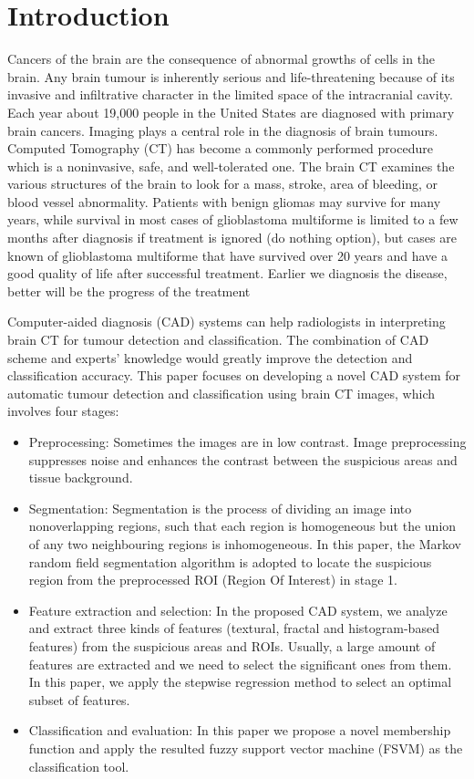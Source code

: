\chapter{Introduction}

      Cancers of the brain are the consequence of abnormal growths of cells in the brain. Any brain tumour is inherently serious and life-threatening because of its invasive and infiltrative character in the limited space of the intracranial cavity. Each year about 19,000 people in the United States are diagnosed with primary brain cancers. Imaging plays a central role in the diagnosis of brain tumours. Computed Tomography (CT) has become a commonly performed procedure which is a noninvasive, safe, and well-tolerated one. The brain CT examines the various structures of the brain to look for a mass, stroke, area of bleeding, or blood vessel abnormality. Patients with benign gliomas may survive for many years, while survival in most cases of glioblastoma multiforme is limited to a few months after diagnosis if treatment is ignored (do nothing option), but cases are known of glioblastoma multiforme that have survived over 20 years and have a good quality of life after successful treatment. Earlier we diagnosis the disease, better will be the progress of the treatment    
      
       Computer-aided diagnosis (CAD) systems can help radiologists in interpreting brain CT for tumour detection and classification. The combination of CAD scheme and experts’ knowledge would greatly improve the detection and classification accuracy. This paper focuses on developing a novel CAD system for automatic tumour detection and classification using brain CT images, which involves four stages:
\begin{itemize}


       
\item  Preprocessing: Sometimes the images are in low contrast. Image preprocessing suppresses noise and enhances the contrast between the suspicious areas and tissue background. 
\item Segmentation: Segmentation is the process of dividing an image into nonoverlapping regions, such that each region
is homogeneous but the union of any two neighbouring regions is inhomogeneous. In this paper, the Markov random field segmentation algorithm is adopted to locate the suspicious region from the preprocessed ROI (Region Of Interest) in stage 1. 
\item Feature extraction and selection: In the proposed CAD system, we analyze and extract three kinds of features (textural, fractal and histogram-based features) from the suspicious areas and ROIs. Usually, a large amount of features are extracted and we need to select the significant ones from them. In this paper, we apply the stepwise regression method to select an optimal subset of features.
\item Classification and evaluation: In this paper we propose a novel membership function and apply the resulted fuzzy support vector machine (FSVM) as the classification tool. 

\end{itemize}


